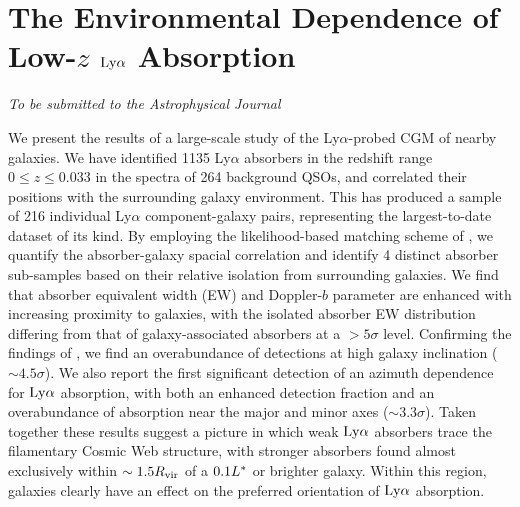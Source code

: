 \chapter[The Environmental Dependence of Low-$z$ $\rm Ly\alpha$ Absorption]{The Environmental Dependence of Low-$z$ $\rm Ly\alpha$ Absorption}
\label{chap:chap5}


\vfill

\begin{flushright}
  \fixspacing %
  \textit{To be submitted to the \emph{Astrophysical Journal}} \\
\end{flushright}

\vspace*{1in} %

\cleardoublepage

\begin{chabstract}

We present the results of a large-scale study of the Ly$\alpha$-probed CGM of nearby galaxies. We have identified 1135 Ly$\alpha$ absorbers in the redshift range $0 \leq z \leq 0.033$ in the spectra of 264 background QSOs, and correlated their positions with the surrounding galaxy environment. This has produced a sample of 216 individual Ly$\alpha$ component-galaxy pairs, representing the largest-to-date dataset of its kind. By employing the likelihood-based matching scheme of \cite{french2017}, we quantify the absorber-galaxy spacial correlation and identify 4 distinct absorber sub-samples based on their relative isolation from surrounding galaxies. We find that absorber equivalent width (EW) and Doppler-$b$ parameter are enhanced with increasing proximity to galaxies, with the isolated absorber EW distribution differing from that of galaxy-associated absorbers at a $>5 \sigma$ level. Confirming the findings of \cite{french2017}, we find an overabundance of detections at high galaxy inclination ($\sim 4.5 \sigma$). We also report the first significant detection of an azimuth dependence for $\rm Ly\alpha$ absorption, with both an enhanced detection fraction and an overabundance of absorption near the major and minor axes ($\sim 3.3 \sigma$). Taken together these results suggest a picture in which weak $\rm Ly\alpha$ absorbers trace the filamentary Cosmic Web structure, with stronger absorbers found almost exclusively within $\sim 1.5 R_{\rm vir}$ of a $0.1 L^{\**}$ or brighter galaxy. Within this region, galaxies clearly have an effect on the preferred orientation of $\rm Ly\alpha$ absorption.

\end{chabstract}


